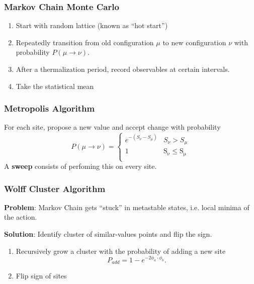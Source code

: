 \documentclass{beamer}
\begin{document}
\begin{frame}
    \frametitle{Markov Chain Monte Carlo}
\begin{enumerate}
    \item Start with random lattice (known as ``hot start'')
    \item Repeatedly transition from old configuration $\mu$ to new configuration $\nu$ with probability $P(\mu\rightarrow\nu)$.
    \item After a thermalization period, record observables at certain intervals. 
    \item Take the statistical mean
\end{enumerate}
\end{frame}

\begin{frame}
    \frametitle{Metropolis Algorithm}
    For each site, propose a new value and accept change with probability
        \begin{equation*}
    P(\mu\rightarrow\nu) = \begin{cases} 
        e^{-(S_\nu - S_\mu)} & S_\nu > S_\mu \\
        1 & \mathrm{S_\nu \leq S_\mu} \\
       \end{cases}
        \end{equation*} 
        A \textbf{sweep} consists of perfoming this on every site.

\end{frame}

\begin{frame}
    \frametitle{Wolff Cluster Algorithm}
        \textbf{Problem}: Markov Chain gets ``stuck'' in metastable states, i.e. local minima of the action.

        \textbf{Solution}: Identify cluster of similar-values points and flip the sign.
    \begin{enumerate}
        \item Recursively grow a cluster with the probability of adding a new site
        \begin{equation*}
            P_{add} = 1-e^{-2\phi_a\cdot\phi_b}.
        \end{equation*}
        \item Flip sign of sites
    

    \end{enumerate}

\end{frame}
\end{document}

